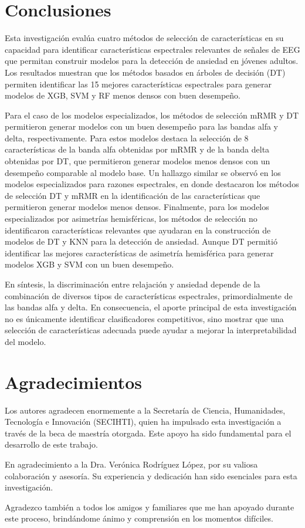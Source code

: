 \documentclass[runningheads]{llncs}
\begin{document}
\section{Conclusiones}
Esta investigación evalúa cuatro métodos de selección de características en su capacidad para identificar características espectrales relevantes de señales de EEG que permitan construir modelos para la detección de ansiedad en jóvenes adultos. Los resultados muestran que los métodos basados en árboles de decisión (DT) permiten identificar las 15 mejores características espectrales para generar modelos de XGB, SVM y RF menos densos con buen desempeño.

Para el caso de los modelos especializados, los métodos de selección mRMR y DT permitieron generar modelos con un buen desempeño para las bandas alfa y delta, respectivamente. Para estos modelos destaca la selección de 8 características de la banda alfa obtenidas por mRMR y de la banda delta obtenidas por DT, que permitieron generar modelos menos densos con un desempeño comparable al modelo base. Un hallazgo similar se observó en los modelos especializados para razones espectrales, en donde destacaron los métodos de selección DT y mRMR en la identificación de las características que permitieron generar modelos menos densos. Finalmente, para los modelos especializados por asimetrías hemisféricas, los métodos de selección no identificaron características relevantes que ayudaran en la construcción de modelos de DT y KNN para la detección de ansiedad. Aunque DT permitió identificar las mejores características de asimetría hemisférica para generar modelos XGB y SVM con un buen desempeño.

En síntesis, la discriminación entre relajación y ansiedad depende de la combinación de diversos tipos de características espectrales, primordialmente de las bandas alfa y delta. En consecuencia, el aporte principal de esta investigación no es únicamente identificar clasificadores competitivos, sino mostrar que una selección de características adecuada puede ayudar a mejorar la interpretabilidad del modelo.

\section*{Agradecimientos}
Los autores agradecen enormemente a la Secretaría de Ciencia, Humanidades, Tecnología e Innovación (SECIHTI), quien ha impulsado esta investigación a través de la beca de maestría otorgada. Este apoyo ha sido fundamental para el desarrollo de este trabajo.

En agradecimiento a la Dra. Verónica Rodríguez López, por su valiosa colaboración y asesoría. Su experiencia y dedicación han sido esenciales para esta investigación.

Agradezco también a todos los amigos y familiares que me han apoyado durante este proceso, brindándome ánimo y comprensión en los momentos difíciles.



\end{document}
